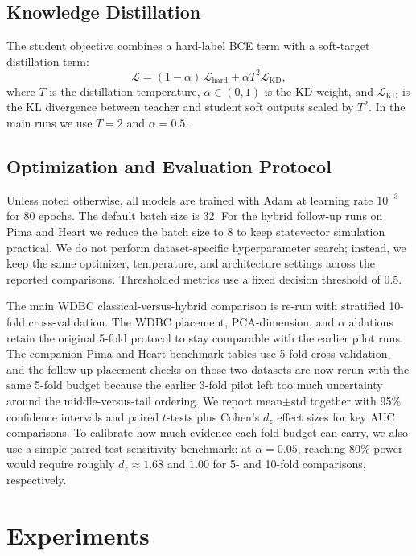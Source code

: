 \documentclass[11pt,a4paper]{article}
\begin{document}
\subsection{Knowledge Distillation}
The student objective combines a hard-label BCE term with a soft-target distillation term:
\begin{equation}
\mathcal{L} = (1-\alpha)\,\mathcal{L}_{\text{hard}} + \alpha T^2 \mathcal{L}_{\text{KD}},
\end{equation}
where $T$ is the distillation temperature, $\alpha \in (0,1)$ is the KD weight, and
$\mathcal{L}_{\text{KD}}$ is the KL divergence between teacher and student soft outputs scaled by
$T^2$. In the main runs we use $T=2$ and $\alpha=0.5$.

\subsection{Optimization and Evaluation Protocol}
Unless noted otherwise, all models are trained with Adam at learning rate $10^{-3}$ for 80 epochs.
The default batch size is 32. For the hybrid follow-up runs on Pima and Heart we reduce the batch
size to 8 to keep statevector simulation practical. We do not perform dataset-specific hyperparameter
search; instead, we keep the same optimizer, temperature, and architecture settings across the
reported comparisons. Thresholded metrics use a fixed decision threshold of 0.5.

The main WDBC classical-versus-hybrid comparison is re-run with stratified 10-fold cross-validation.
The WDBC placement, PCA-dimension, and $\alpha$ ablations retain the original 5-fold protocol to stay
comparable with the earlier pilot runs. The companion Pima and Heart benchmark tables use 5-fold
cross-validation, and the follow-up placement checks on those two datasets are now rerun with the
same 5-fold budget because the earlier 3-fold pilot left too much uncertainty around the
middle-versus-tail ordering. We report
mean$\pm$std together with 95\% confidence intervals and paired $t$-tests plus Cohen's $d_z$ effect
sizes for key AUC comparisons. To calibrate how much evidence each fold budget can carry, we also use
a simple paired-test sensitivity benchmark: at $\alpha=0.05$, reaching 80\% power would require
roughly $d_z \approx 1.68$ and $1.00$ for 5- and 10-fold comparisons, respectively.

\section{Experiments}
\label{sec:exp}
\end{document}
